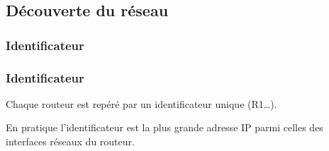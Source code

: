 \documentclass[svgnames,11pt]{beamer}
\begin{document}
\subsection{Découverte du réseau}
\subsubsection{Identificateur}
\begin{frame}
    \frametitle{Identificateur}

    \begin{aretenir}[]
        Chaque routeur est repéré par un identificateur unique (R1\dots). 
    \end{aretenir}
    \begin{aretenir}[Remarque]
    En pratique l'identificateur est la plus grande adresse IP parmi celles des interfaces réseaux du routeur.
    \end{aretenir}
\end{frame}
\end{document}

